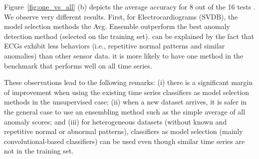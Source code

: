 Figure~\ref{fig:one_vs_all} (b) depicts the average accuracy for 8 out of the 16 tests . We observe very different results. First, for Electrocardiograms (SVDB),  the model selection methods  the Avg. Ensemble outperform the best anomaly detection method (selected on the training set).    can be explained by the fact that ECGs exhibit less  behaviors (i.e., repetitive normal patterns and similar anomalies) than other sensor data.  it is more likely to have one method in the benchmark that performs well on all  time series. 

These observations lead to the following remarks: (i) there is a significant margin of improvement when using the existing time series classifiers as model selection methods in the unsupervised case; (ii) when a new dataset arrives, it is safer in the general case to use an ensembling method such as the simple average of all anomaly scores; and (iii) for heterogeneous datasets (without known and repetitive normal or abnormal patterns), classifiers as model selection (mainly convolutional-based classifiers) can be used even though similar time series are not in the training set.